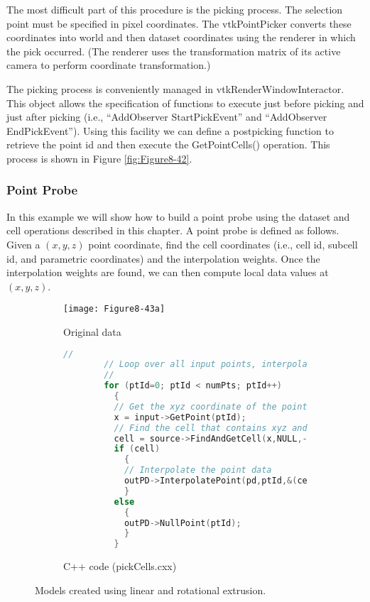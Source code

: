 The most difficult part of this procedure is the picking process. The selection point must be specified in pixel coordinates. The vtkPointPicker converts these coordinates into world and then dataset coordinates using the renderer in which the pick occurred. (The renderer uses the transformation matrix of its active camera to perform coordinate transformation.)

The picking process is conveniently managed in vtkRenderWindowInteractor. This object allows the specification of functions to execute just before picking and just after picking (i.e., ``AddObserver StartPickEvent'' and ``AddObserver EndPickEvent''). Using this facility we can define a postpicking function to retrieve the point id and then execute the GetPointCells() operation. This process is shown in Figure \ref{fig:Figure8-42}.

\subsubsection{Point Probe}
\label{subsec:examples.point_probe}

In this example we will show how to build a point probe using the dataset and cell operations described in this chapter. A point probe is defined as follows. Given a $(x,y,z)$ point coordinate, find the cell coordinates (i.e., cell id, subcell id, and parametric coordinates) and the interpolation weights. Once the interpolation weights are found, we can then compute local data values at $(x,y,z)$.

\begin{figure}[!htb]
    \centering
    \begin{subfigure}{0.96\linewidth}
        \centering
        \texttt{[image: Figure8-43a]}
        \caption{Original data}\label{fig:Figure8-43a}
    \end{subfigure}
    \hfill
    \begin{subfigure}{0.96\linewidth}
        \centering
        \begin{lstlisting}[language=C++,  caption={}, numbers=none, frame=none]
        //
        // Loop over all input points, interpolating source data
        //
        for (ptId=0; ptId < numPts; ptId++)
          {
          // Get the xyz coordinate of the point in the input dataset
          x = input->GetPoint(ptId);
          // Find the cell that contains xyz and get it
          cell = source->FindAndGetCell(x,NULL,-1,tol2,subId,pcoords,weights);
          if (cell)
            {
            // Interpolate the point data
            outPD->InterpolatePoint(pd,ptId,&(cell->PointIds),weights);
            }
          else
            {
            outPD->NullPoint(ptId);
            }
          }
        \end{lstlisting}
        \caption{C++ code (pickCells.cxx)}
    \end{subfigure}%
    \caption{Models created using linear and rotational extrusion.}
    \label{fig:Figure8-43}
\end{figure}

